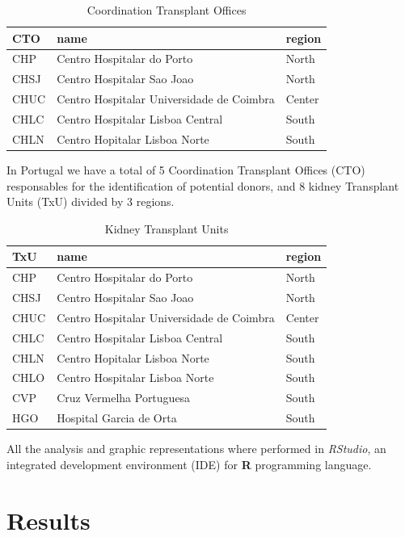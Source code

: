\documentclass[]{book}
\begin{document}
\begin{table}

\caption{\label{tab:ctos}Coordination Transplant Offices}
\centering
\begin{tabular}[t]{lll}
\toprule
CTO & name & region\\
\midrule
CHP & Centro Hospitalar do Porto & North\\
CHSJ & Centro Hospitalar Sao Joao & North\\
CHUC & Centro Hospitalar Universidade de Coimbra & Center\\
CHLC & Centro Hospitalar Lisboa Central & South\\
CHLN & Centro Hopitalar Lisboa Norte & South\\
\bottomrule
\end{tabular}
\end{table}

In Portugal we have a total of 5 Coordination Transplant Offices (CTO)
responsables for the identification of potential donors, and 8 kidney
Transplant Units (TxU) divided by 3 regions.

\begin{table}

\caption{\label{tab:txus}Kidney Transplant Units}
\centering
\begin{tabular}[t]{l|l|l}
\hline
TxU & name & region\\
\hline
CHP & Centro Hospitalar do Porto & North\\
\hline
CHSJ & Centro Hospitalar Sao Joao & North\\
\hline
CHUC & Centro Hospitalar Universidade de Coimbra & Center\\
\hline
CHLC & Centro Hospitalar Lisboa Central & South\\
\hline
CHLN & Centro Hopitalar Lisboa Norte & South\\
\hline
CHLO & Centro Hospitalar Lisboa Norte & South\\
\hline
CVP & Cruz Vermelha Portuguesa & South\\
\hline
HGO & Hospital Garcia de Orta & South\\
\hline
\end{tabular}
\end{table}

All the analysis and graphic representations where performed in
\emph{RStudio}, an integrated development environment (IDE) for
\textbf{R} programming language.

\chapter{Results}\label{result}
\end{document}
